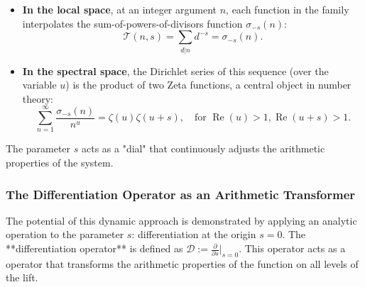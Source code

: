 \documentclass[11pt,a4paper]{amsart}
\DeclareMathOperator{\re}{Re}
\theoremstyle{plain}
\theoremstyle{definition}
\theoremstyle{remark}
\begin{document}
\begin{itemize}
    \item \textbf{In the local space}, at an integer argument $n$, each function in the family interpolates the sum-of-powers-of-divisors function $\sigma_{-s}(n)$:
    \[
    \mathcal{T}(n,s) = \sum_{d|n} d^{-s} = \sigma_{-s}(n).
    \]
    \item \textbf{In the spectral space}, the Dirichlet series of this sequence (over the variable $u$) is the product of two Zeta functions, a central object in number theory:
    \[
    \sum_{n=1}^{\infty}\frac{\sigma_{-s}(n)}{n^u} = \zeta(u)\zeta(u+s), \quad \text{for } \re(u)>1, \re(u+s)>1.
    \]
\end{itemize}
The parameter $s$ acts as a "dial" that continuously adjusts the arithmetic properties of the system.

\subsubsection{The Differentiation Operator as an Arithmetic Transformer}
The potential of this dynamic approach is demonstrated by applying an analytic operation to the parameter $s$: differentiation at the origin $s=0$. The **differentiation operator** is defined as $\mathcal{D} := \frac{\partial}{\partial s}\big|_{s=0}$. This operator acts as a operator that transforms the arithmetic properties of the function on all levels of the lift.
\end{document}
